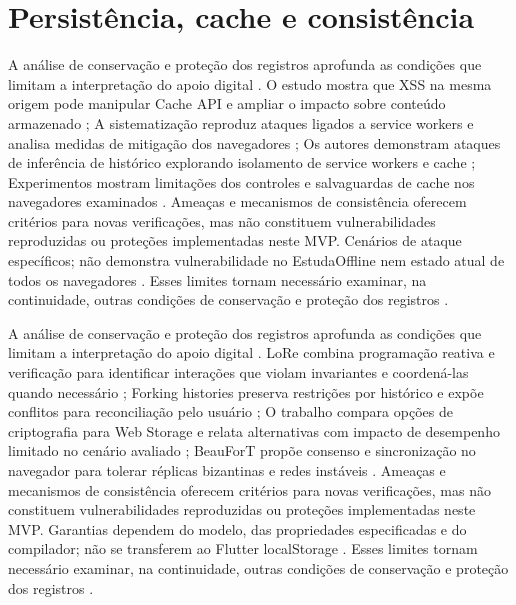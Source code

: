 \clearpage\section{Persistência, cache e consistência}

A análise de conservação e proteção dos registros aprofunda as condições que limitam a interpretação do apoio digital \citep{OS01} \citep{OS02} \citep{OS03} \citep{OS06}. O estudo mostra que XSS na mesma origem pode manipular Cache API e ampliar o impacto sobre conteúdo armazenado \citep{OS01}; A sistematização reproduz ataques ligados a service workers e analisa medidas de mitigação dos navegadores \citep{OS02}; Os autores demonstram ataques de inferência de histórico explorando isolamento de service workers e cache \citep{OS03}; Experimentos mostram limitações dos controles e salvaguardas de cache nos navegadores examinados \citep{OS06}. Ameaças e mecanismos de consistência oferecem critérios para novas verificações, mas não constituem vulnerabilidades reproduzidas ou proteções implementadas neste MVP. Cenários de ataque específicos; não demonstra vulnerabilidade no EstudaOffline nem estado atual de todos os navegadores \citep{OS01} \citep{OS02} \citep{OS03} \citep{OS06}. Esses limites tornam necessário examinar, na continuidade, outras condições de conservação e proteção dos registros \citep{OS01} \citep{OS02} \citep{OS03} \citep{OS06}.

A análise de conservação e proteção dos registros aprofunda as condições que limitam a interpretação do apoio digital \citep{OS07} \citep{OS08} \citep{OS09} \citep{OS10}. LoRe combina programação reativa e verificação para identificar interações que violam invariantes e coordená-las quando necessário \citep{OS07}; Forking histories preserva restrições por histórico e expõe conflitos para reconciliação pelo usuário \citep{OS08}; O trabalho compara opções de criptografia para Web Storage e relata alternativas com impacto de desempenho limitado no cenário avaliado \citep{OS09}; BeauForT propõe consenso e sincronização no navegador para tolerar réplicas bizantinas e redes instáveis \citep{OS10}. Ameaças e mecanismos de consistência oferecem critérios para novas verificações, mas não constituem vulnerabilidades reproduzidas ou proteções implementadas neste MVP. Garantias dependem do modelo, das propriedades especificadas e do compilador; não se transferem ao Flutter localStorage \citep{OS07} \citep{OS08} \citep{OS09} \citep{OS10}. Esses limites tornam necessário examinar, na continuidade, outras condições de conservação e proteção dos registros \citep{OS07} \citep{OS08} \citep{OS09} \citep{OS10}.

